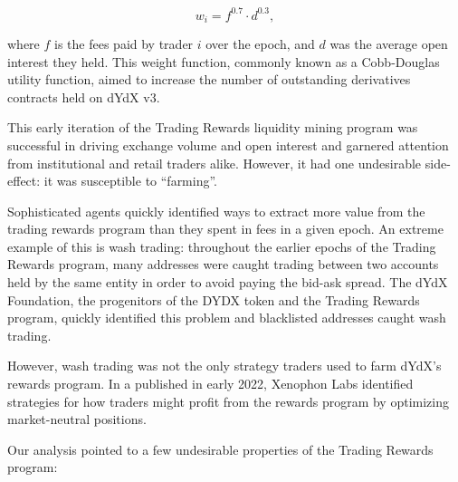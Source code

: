         \begin{equation}
            w_i = f^{0.7} \cdot d^{0.3},
        \end{equation}

        where $f$ is the fees paid by trader $i$ over the epoch, and $d$ was the average open interest they held. This weight function, commonly known as a Cobb-Douglas utility function, aimed to increase the number of outstanding derivatives contracts held on dYdX v3. 

        This early iteration of the Trading Rewards liquidity mining program was successful in driving exchange volume and open interest and garnered attention from institutional and retail traders alike. However, it had one undesirable side-effect: it was susceptible to ``farming''. 
        
        Sophisticated agents quickly identified ways to extract more value from the trading rewards program than they spent in fees in a given epoch. An extreme example of this is wash trading: throughout the earlier epochs of the Trading Rewards program, many addresses were caught trading between two accounts held by the same entity in order to avoid paying the bid-ask spread. The dYdX Foundation, the progenitors of the DYDX token and the Trading Rewards program, quickly identified this problem and blacklisted addresses caught wash trading.

        However, wash trading was not the only strategy traders used to farm dYdX's rewards program. In a  published in early 2022, Xenophon Labs identified strategies for how traders might profit from the rewards program by optimizing market-neutral positions. 
        
        Our analysis pointed to a few undesirable properties of the Trading Rewards program:

